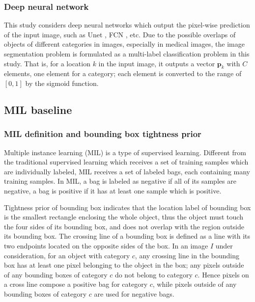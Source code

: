\documentclass[runningheads]{llncs}
\def\p{{\mathbf p}}
\begin{document}
\subsubsection{Deep neural network}
This study considers deep neural networks which output the pixel-wise prediction of the input image, such as Unet \cite{ronneberger2015u}, FCN \cite{long2015fully}, etc. Due to the possible overlaps of objects of different categories in images, especially in medical images, the image segmentation problem is formulated as a multi-label classification problem in this study. That is, for a location $k$ in the input image, it outputs a vector $\p_k$ with $C$ elements, one element for a category; each element is converted to the range of $[0, 1]$ by the sigmoid function.



\subsection{MIL baseline}

\subsubsection{MIL definition and bounding box tightness prior}
Multiple instance learning (MIL) is a type of supervised learning. Different from the traditional supervised learning which receives a set of training samples which are individually labeled, MIL receives a set of labeled bags, each containing many training samples. In MIL, a bag is labeled as negative if all of its samples are negative, a bag is positive if it has at least one sample which is positive. 

Tightness prior of bounding box indicates that the location label of bounding box is the smallest rectangle enclosing the whole object, thus the object must touch the four sides of its bounding box, and does not overlap with the region outside its bounding box. The crossing line of a bounding box is defined as a line with its two endpoints located on the opposite sides of the box. In an image $I$ under consideration, for an object with category $c$, any crossing line in the bounding box has at least one pixel belonging to the object in the box; any pixels outside of any bounding boxes of category $c$ do not belong to category $c$. Hence pixels on a cross line compose a positive bag for category $c$, while pixels outside of any bounding boxes of category $c$ are used for negative bags. 
\end{document}
